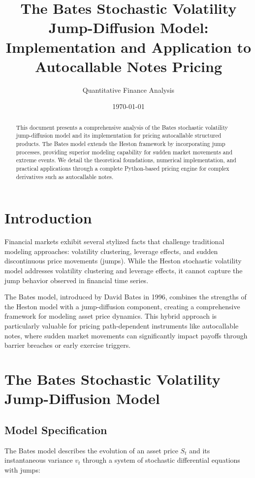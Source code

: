 \documentclass[12pt,a4paper]{article}
\title{The Bates Stochastic Volatility Jump-Diffusion Model: \\ Implementation and Application to Autocallable Notes Pricing}
\author{Quantitative Finance Analysis}
\date{\today}
\begin{document}
\maketitle

\begin{abstract}
This document presents a comprehensive analysis of the Bates stochastic volatility jump-diffusion model and its implementation for pricing autocallable structured products. The Bates model extends the Heston framework by incorporating jump processes, providing superior modeling capability for sudden market movements and extreme events. We detail the theoretical foundations, numerical implementation, and practical applications through a complete Python-based pricing engine for complex derivatives such as autocallable notes.
\end{abstract}

\section{Introduction}

Financial markets exhibit several stylized facts that challenge traditional modeling approaches: volatility clustering, leverage effects, and sudden discontinuous price movements (jumps). While the Heston stochastic volatility model addresses volatility clustering and leverage effects, it cannot capture the jump behavior observed in financial time series.

The Bates model, introduced by David Bates in 1996, combines the strengths of the Heston model with a jump-diffusion component, creating a comprehensive framework for modeling asset price dynamics. This hybrid approach is particularly valuable for pricing path-dependent instruments like autocallable notes, where sudden market movements can significantly impact payoffs through barrier breaches or early exercise triggers.

\section{The Bates Stochastic Volatility Jump-Diffusion Model}

\subsection{Model Specification}

The Bates model describes the evolution of an asset price $S_t$ and its instantaneous variance $v_t$ through a system of stochastic differential equations with jumps:
\end{document}
